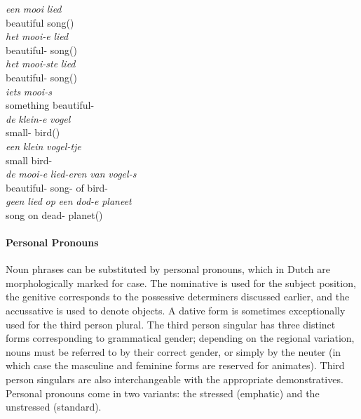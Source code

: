 \begin{exe}
\ex\label{gloss:simple_np}
\gll \textit{een} \textit{mooi} \textit{lied}\\
 beautiful song()\\
\ex\label{gloss:adjective_definite_n}
\gll \textit{het} \textit{mooi-e} \textit{lied}\\
 beautiful- song()\\
\ex\label{gloss:superlative}
\gll \textit{het} \textit{mooi-ste} \textit{lied}\\
 beautiful- song()\\
\ex\label{gloss:partitive}
\gll \textit{iets} \textit{mooi-s}\\
something beautiful-\\
\ex\label{gloss:adjective_definite_nn}
\gll \textit{de} \textit{klein-e} \textit{vogel}\\
 small- bird()\\
\ex\label{gloss:diminutive}
\gll \textit{een} \textit{klein} \textit{vogel-tje}\\
 small bird-\\
\ex\label{gloss:genitive}
\gll \textit{de} \textit{mooi-e} \textit{lied-eren} \textit{van} \textit{vogel-s}\\
 beautiful- song- of bird-\\
\ex\label{gloss:adjp}
\gll \textit{geen} \textit{lied} \textit{op} \textit{een} \textit{dod-e} \textit{planeet}\\
 song on  dead- planet()\\
\end{exe}


\paragraph{Personal Pronouns}
Noun phrases can be substituted by personal pronouns, which in Dutch are morphologically marked for case.
The nominative is used for the subject position, the genitive corresponds to the possessive determiners discussed earlier, and the accussative is used to denote objects.
A dative form is sometimes exceptionally used for the third person plural.
The third person singular has three distinct forms corresponding to grammatical gender; 
depending on the regional variation, nouns must be referred to by their correct gender, or simply by the neuter (in which case the masculine and feminine forms are reserved for animates).
Third person singulars are also interchangeable with the appropriate demonstratives.
Personal pronouns come in two variants: the stressed (emphatic) and the unstressed (standard).


